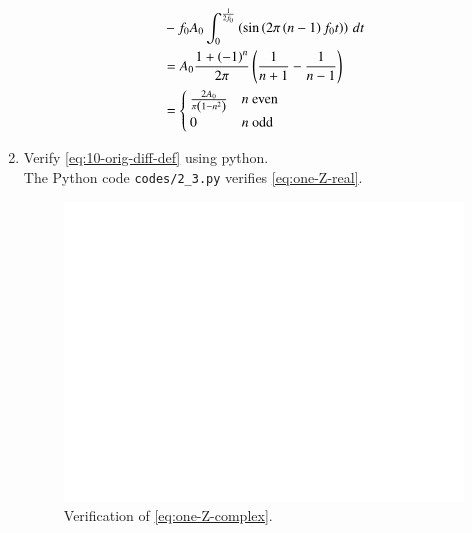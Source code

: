 \documentclass[journal,12pt,twocolumn]{IEEEtran}
\renewcommand\thesection{\arabic{section}}
\begin{document}
\begin{enumerate}[label=\thesection.\arabic*,ref=\thesection.\theenumi]
\begin{align}
        &- f_0A_0\int_{0}^{\frac{1}{2f_0}}\left(\sin\left(2\pi\left(n-1\right)f_0t\right)\right)\, dt \\ 
        &= A_0\frac{1+\left(-1\right)^n}{2\pi}\left(\frac{1}{n+1} - \frac{1}{n-1}\right) \\
        &= 
        \begin{cases}
            \frac{2A_0}{\pi\left(1-n^2\right)} & n\ \text{even} \\
            0 & n\ \text{odd}
        \end{cases}\label{eq:ck-xt}
\end{align}
\item Verify 
	\eqref{eq:10-orig-diff-def}
	using python.\\
	\solution The Python code \texttt{codes/2\_3.py} verifies \eqref{eq:one-Z-real}.
\begin{figure}[!ht]
    \includegraphics[width=\columnwidth]{figs/2_3.png}
    \caption{Verification of \eqref{eq:one-Z-complex}.}
    \label{fig:ver-complex}
\end{figure}


\end{enumerate}
\end{document}
